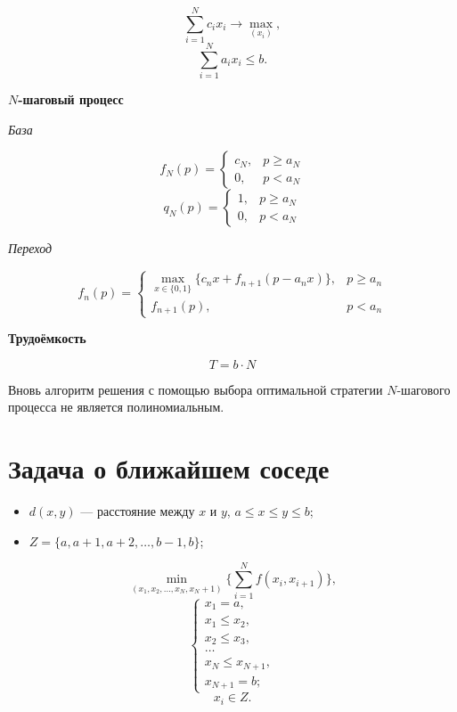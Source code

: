 \[
\sum_{i=1}^N c_i x_i \to \max_{(x_i)},
\]
\[
\sum_{i=1}^N a_i x_i \le b.
\]

\bigskip

\textbf{$N$-шаговый процесс}

\textit{База}

\[
f_N(p) = \begin{cases}
	c_N,& p \ge a_N \\
	0,& p < a_N
\end{cases}
\]
\[
q_N(p) = \begin{cases}
	1,& p \ge a_N \\
	0,& p < a_N
\end{cases}
\]

\bigskip

\textit{Переход}

\[
f_n(p) = \begin{cases}
	\max\limits_{x \in \{0, 1\}} \{c_n x + f_{n+1}(p - a_n x)\},& p \ge a_n \\
	f_{n+1}(p),& p < a_n
\end{cases}
\]

\bigskip

\textbf{Трудоёмкость}

\[
T = b \cdot N
\]

Вновь алгоритм решения с помощью выбора оптимальной стратегии $N$-шагового процесса не является полиномиальным.

\section{Задача о ближайшем соседе}

\begin{itemize}[nosep]
	\item $d(x, y)$ --- расстояние между $x$ и $y$, $a \le x \le y \le b$;
	
	\item $Z = \{a, a+1, a+2, \dots, b - 1, b\}$;
\end{itemize}

\[
\min_{(x_1, x_2, \dots, x_{N}, x_N+1)} \bigg\{\sum_{i=1}^N f(x_i, x_{i+1})\bigg\},
\]
\[
\begin{cases}
	x_1 = a, \\
	x_1 \le x_2, \\
	x_2 \le x_3, \\
	\dots \\
	x_N \le x_{N+1}, \\
	x_{N+1}=b;
 \end{cases}
\]
\[
x_i \in Z.
\]

